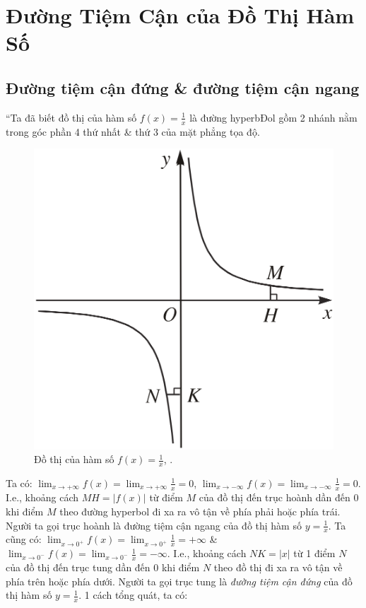 \documentclass[oneside]{book}
\numberwithin{equation}{section}
\begin{document}

\section{Đường Tiệm Cận của Đồ Thị Hàm Số}

\subsection{Đường tiệm cận đứng \& đường tiệm cận ngang}
``Ta đã biết đồ thị của hàm số $f(x) = \frac{1}{x}$ là đường hyperbĐol gồm 2 nhánh nằm trong góc phần 4 thứ nhất \& thứ 3 của mặt phẳng tọa độ.

\begin{figure}[H]
	\centering
	\includegraphics[scale=0.13]{hyperbol}
	\caption{Đồ thị của hàm số $f(x) = \frac{1}{x}$, \cite[Hình 1.6, p. 28]{SGK_Toan_12_giai_tich_nang_cao}.}
	\label{fig:hyperbol}
\end{figure}
Ta có: $\lim_{x\to+\infty} f(x) = \lim_{x\to+\infty} \frac{1}{x} = 0$, $\lim_{x\to-\infty} f(x) = \lim_{x\to-\infty} \frac{1}{x} = 0$. I.e., khoảng cách $MH = |f(x)|$ từ điểm $M$ của đồ thị đến trục hoành dần đến $0$ khi điểm $M$ theo đường hyperbol đi xa ra vô tận về phía phải hoặc phía trái. Người ta gọi trục hoành là đường tiệm cận ngang của đồ thị hàm số $y = \frac{1}{x}$. Ta cũng có: $\lim_{x\to 0^+} f(x) = \lim_{x\to 0^+} \frac{1}{x} = +\infty$ \& $\lim_{x\to 0^-} f(x) = \lim_{x\to 0^-} \frac{1}{x} = -\infty$. I.e., khoảng cách $NK = |x|$ từ 1 điểm $N$ của đồ thị đến trục tung dần đến $0$ khi điểm $N$ theo đồ thị đi xa ra vô tận về phía trên hoặc phía dưới. Người ta gọi trục tung là \textit{đường tiệm cận đứng} của đồ thị hàm số $y = \frac{1}{x}$. 1 cách tổng quát, ta có:
\end{document}
